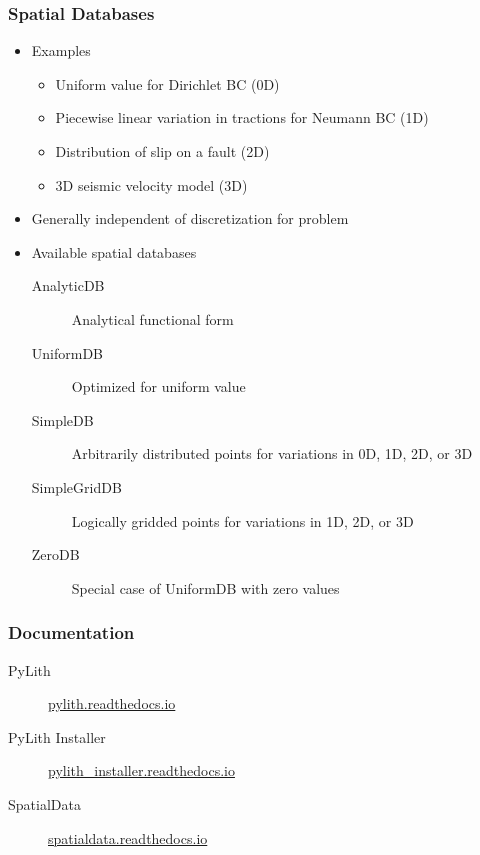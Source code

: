 \documentclass[aspectratio=169]{beamer}
\begin{document}
\begin{frame}
  \frametitle{Spatial Databases}

  \begin{itemize}
 \item Examples
    \begin{itemize}
    \item Uniform value for Dirichlet BC (0D)
    \item Piecewise linear variation in tractions for Neumann BC (1D)
    \item Distribution of slip on a fault (2D)
    \item 3D seismic velocity model (3D)
    \end{itemize}\pause
  \item Generally independent of discretization for problem\pause
  \item Available spatial databases
    \begin{description}
    \item[AnalyticDB] Analytical functional form
    \item[UniformDB] Optimized for uniform value
    \item[SimpleDB] Arbitrarily distributed points for variations in 0D, 1D, 2D, or 3D
    \item[SimpleGridDB] Logically gridded points for variations in 1D, 2D, or 3D
    \item[ZeroDB] Special case of UniformDB with zero values
    \end{description}
 \end{itemize}

\end{frame}


\begin{frame}
  \frametitle{Documentation}

  \begin{description}
  \item[PyLith] \url{pylith.readthedocs.io}
  \item[PyLith Installer] \url{pylith_installer.readthedocs.io}
  \item[SpatialData] \url{spatialdata.readthedocs.io}
  \end{description}
  
\end{frame}
\end{document}
